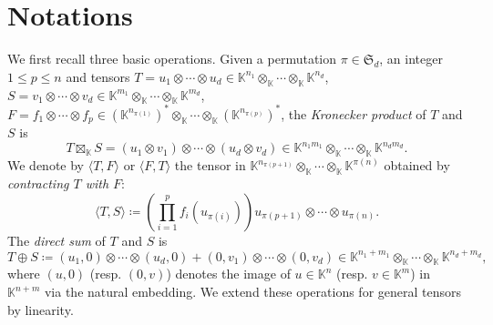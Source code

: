 \section{Notations}\label{sec:prelim}
We first recall three basic operations. 
Given a permutation $\pi \in \mathfrak{S}_d$,  an integer $1 \le p \le n$ and tensors $T = u_1 \otimes \cdots \otimes u_d \in \mathbb{K}^{n_1} \otimes_{\mathbb{K}} \cdots \otimes_{\mathbb{K}} \mathbb{K}^{n_d}$,  $S = v_1 \otimes \cdots \otimes v_d \in \mathbb{K}^{m_1} \otimes_{\mathbb{K}} \cdots \otimes_{\mathbb{K}} \mathbb{K}^{m_d}$,  $F = f_{1} \otimes \cdots \otimes f_p  \in (\mathbb{K}^{n_{\pi(1)}})^\ast \otimes_{\mathbb{K}} \cdots \otimes_{\mathbb{K}} (\mathbb{K}^{n_{\pi(p)}})^\ast$,  the \emph{Kronecker product} of $T$ and $S$ is 
\[
T \boxtimes_{\mathbb{K}} S = (u_1\otimes v_1) \otimes \cdots \otimes (u_d \otimes v_d) \in \mathbb{K}^{n_1 m_1} \otimes_{\mathbb{K}} \cdots \otimes_{\mathbb{K}} \mathbb{K}^{n_d m_d}.
\]
We denote by $\langle T,  F \rangle $ or $\langle F,  T \rangle$ the tensor in $\mathbb{K}^{n_{\pi(p+1)}} \otimes_{\mathbb{K}} \cdots \otimes_{\mathbb{K}} \mathbb{K}^{\pi(n)}$ obtained by \emph{contracting $T$ with $F$}:
\[
\langle T,  S \rangle \coloneqq
\left( \prod_{i=1}^p f_i (u_{\pi(i)}) \right) u_{\pi(p+1)} \otimes \cdots \otimes u_{\pi(n)}. 
\]
The \emph{direct sum} of $T$ and $S$ is 
\[ 
T \oplus S \coloneqq (u_1,0)\otimes \cdots \otimes (u_d,0)+(0,v_1)\otimes \cdots \otimes (0,v_d) \in \mathbb{K}^{n_1 + m_1} \otimes_{\mathbb{K}} \cdots \otimes_{\mathbb{K}} \mathbb{K}^{n_d + m_d},
\]
where $(u,0)$ (resp.  $(0,v)$) denotes the image of $u \in \mathbb{K}^{n}$ (resp.  $v \in \mathbb{K}^{m}$) in $\mathbb{K}^{n + m}$ via the natural embedding. We extend these operations for general tensors by linearity.  
